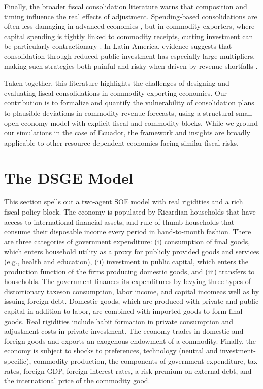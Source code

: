 \documentclass[12pt]{article}
\begin{document}
Finally, the broader fiscal consolidation literature warns that composition and timing influence the real effects of adjustment. Spending-based consolidations are often less damaging in advanced economies \citep[see][]{AlesinaFaveroGiavazzi2015}, but in commodity exporters, where capital spending is tightly linked to commodity receipts, cutting investment can be particularly contractionary \citep[see][]{Guajardo2014}. In Latin America, evidence suggests that consolidation through reduced public investment has especially large multipliers, making such strategies both painful and risky when driven by revenue shortfalls \citep[see][]{CarriereSwallow2018}.

Taken together, this literature highlights the challenges of designing and evaluating fiscal consolidations in commodity-exporting economies. Our contribution is to formalize and quantify the vulnerability of consolidation plans to plausible deviations in commodity revenue forecasts, using a structural small open economy model with explicit fiscal and commodity blocks. While we ground our simulations in the case of Ecuador, the framework and insights are broadly applicable to other resource-dependent economies facing similar fiscal risks.


\section{The DSGE Model}


This section spells out a two-agent SOE model with real rigidities and a rich fiscal policy block. The economy is populated by Ricardian households that have access to international financial assets, and rule-of-thumb households that consume their disposable income every period in hand-to-mouth fashion. There are three categories of government expenditure: (i) consumption of final goods, which enters household utility as a proxy for publicly provided goods and services (e.g., health and education), (ii) investment in public capital, which enters the production function of the firms producing domestic goods, and (iii) transfers to households. The government finances its expenditures by levying three types of distortionary taxes\textemdash on consumption, labor income, and capital income\textemdash as well as by issuing foreign debt. Domestic goods, which are produced with private and public capital in addition to labor, are combined with imported goods to form final goods. Real rigidities include habit formation in private consumption and adjustment costs in private investment. The economy trades in domestic and foreign goods and exports an exogenous endowment of a commodity. Finally, the economy is subject to shocks to preferences, technology (neutral and investment-specific), commodity production, the components of government expenditure, tax rates, foreign GDP, foreign interest rates, a risk premium on external debt, and the international price of the commodity good.
\end{document}
